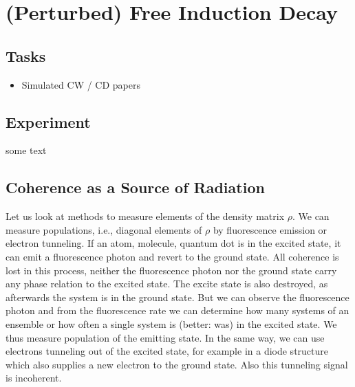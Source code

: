 

\chapter{(Perturbed) Free Induction Decay}



\section{Tasks}

\begin{itemize}
\item Simulated CW / CD papers
\end{itemize}




\section{Experiment}

some text

\section{Coherence as a Source of Radiation}


Let us look at methods to measure elements of the density matrix $\rho$. We can measure populations, i.e., diagonal elements of $\rho$ by fluorescence emission or electron tunneling. If an atom, molecule, quantum dot is in the excited state, it can emit a fluorescence photon and revert to the ground state. All coherence is lost in this process, neither the fluorescence photon nor the ground state carry any phase relation to the excited state. The excite state is also destroyed, as afterwards the system is in the ground state. But we can observe the fluorescence photon and from the fluorescence rate we can determine how many systems of an ensemble or how often a single system is (better: was) in the excited state. We thus measure population of the emitting state. In the same way, we can use electrons tunneling out of the excited state, for example in a diode structure which also supplies  a new electron to the ground state. Also this tunneling signal is incoherent.

